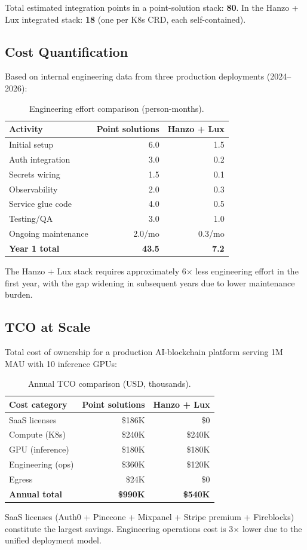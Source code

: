 Total estimated integration points in a point-solution stack: \textbf{80}. In the Hanzo + Lux integrated stack: \textbf{18} (one per K8s CRD, each self-contained).

\subsection{Cost Quantification}

Based on internal engineering data from three production deployments (2024--2026):

\begin{table}[H]
\centering
\caption{Engineering effort comparison (person-months).}
\footnotesize
\begin{tabular}{@{}lrr@{}}
\toprule
Activity & Point solutions & Hanzo + Lux \\
\midrule
Initial setup & 6.0 & 1.5 \\
Auth integration & 3.0 & 0.2 \\
Secrets wiring & 1.5 & 0.1 \\
Observability & 2.0 & 0.3 \\
Service glue code & 4.0 & 0.5 \\
Testing/QA & 3.0 & 1.0 \\
Ongoing maintenance & 2.0/mo & 0.3/mo \\
\midrule
\textbf{Year 1 total} & \textbf{43.5} & \textbf{7.2} \\
\bottomrule
\end{tabular}
\end{table}

The Hanzo + Lux stack requires approximately 6$\times$ less engineering effort in the first year, with the gap widening in subsequent years due to lower maintenance burden.

\subsection{TCO at Scale}

Total cost of ownership for a production AI-blockchain platform serving 1M MAU with 10 inference GPUs:

\begin{table}[H]
\centering
\caption{Annual TCO comparison (USD, thousands).}
\footnotesize
\begin{tabular}{@{}lrr@{}}
\toprule
Cost category & Point solutions & Hanzo + Lux \\
\midrule
SaaS licenses & \$186K & \$0 \\
Compute (K8s) & \$240K & \$240K \\
GPU (inference) & \$180K & \$180K \\
Engineering (ops) & \$360K & \$120K \\
Egress & \$24K & \$0 \\
\midrule
\textbf{Annual total} & \textbf{\$990K} & \textbf{\$540K} \\
\bottomrule
\end{tabular}
\end{table}

SaaS licenses (Auth0 + Pinecone + Mixpanel + Stripe premium + Fireblocks) constitute the largest savings. Engineering operations cost is 3$\times$ lower due to the unified deployment model.

